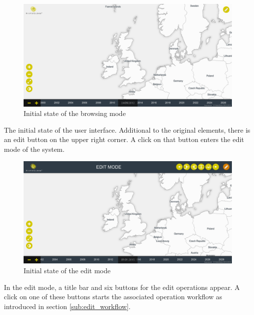 \newpage
\begin{minipage}[t]{0.47\textwidth}

  \begin{figure}[H]
    \centering
    \includegraphics[width=1.0\textwidth]{graphics/development/user_interface_design_process/1_init.png}
    \caption{Initial state of the browsing mode}
    \label{fig:final_1_init}
  \end{figure}

  The initial state of the user interface. Additional to the original elements, there is an edit button on the upper right corner. A click on that button enters the edit mode of the system.

\end{minipage}    %
\hspace{1.5em}    %
\begin{minipage}[t]{0.47\textwidth}

  \begin{figure}[H]
    \centering
    \includegraphics[width=1.0\textwidth]{graphics/development/user_interface_design_process/2_edit_mode.png}
    \caption{Initial state of the edit mode}
    \label{fig:final_2_edit_mode}
  \end{figure}

  In the edit mode, a title bar and six buttons for the edit operations appear. A click on one of these buttons starts the associated operation workflow as introduced in section \ref{sub:edit_workflow}.

\end{minipage}

